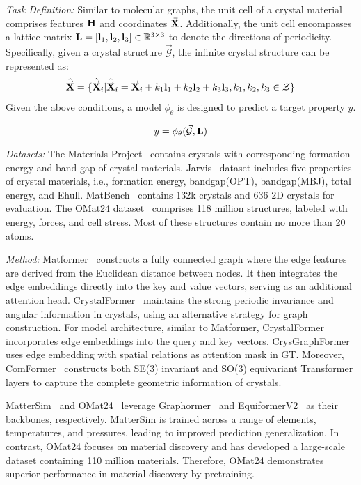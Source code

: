 \textit{Task Definition:}
Similar to molecular graphs, the unit cell of a crystal material comprises features $\mathbf{H}$ and  coordinates $\vec{\mathbf{X}}$. Additionally, the unit cell encompasses a lattice matrix $\mathbf{L} = [\mathbf{l}_1, \mathbf{l}_2, \mathbf{l}_3] \in \mathbb{R}^{3 \times 3}$ to denote the directions of periodicity. Specifically, given a crystal structure $\vec{\mathcal{G}}$, the infinite crystal structure can be represented as:
\begin{align}
    \hat{\vec{\mathbf{X}}} = \{ \hat{\vec{\mathbf{X}}}_i| \hat{\vec{\mathbf{X}}}_i = \vec{\mathbf{X}}_i + k_{1}\mathbf{l}_{1} + k_{2}\mathbf{l}_{2} + k_{3}\mathbf{l}_{3}, k_{1}, k_{2}, k_{3} \in \mathcal{Z} \}
\end{align}
Given the above conditions, a model $\phi_\theta$ is designed to predict a target property $y$.

\begin{equation}
    y = \phi_\theta(\vec{\mathcal{G}}, \mathbf{L})
\end{equation}

\textit{Datasets:}
The Materials Project~\cite{jain2013materials} contains crystals with corresponding formation energy and band gap of crystal materials. 
Jarvis~\cite{choudhary2020joint} dataset includes five properties of crystal materials, i.e., formation energy, bandgap(OPT), bandgap(MBJ), total energy, and Ehull.
MatBench~\cite{dunn2020benchmarking} contains 132k crystals and 636 2D crystals for evaluation.
The OMat24 dataset~\cite{barroso2024open} comprises 118 million structures, labeled with energy, forces, and cell stress. Most of these structures contain no more than 20 atoms.


\textit{Method:}
Matformer~\cite{yan2022periodic} constructs a fully connected graph where the edge features are derived from the Euclidean distance between nodes. It then integrates the edge embeddings directly into the key and value vectors, serving as an additional attention head.
CrystalFormer~\cite{wang2024conformal}  maintains the strong periodic invariance and angular information in crystals, 
using an alternative strategy for graph construction. 
For model architecture, similar to Matformer, CrystalFormer incorporates edge embeddings into the query and key vectors.
CrysGraphFormer~\cite{sun2024crysgraphformer} uses edge embedding with spatial relations as attention mask in GT. 
Moreover, ComFormer~\cite{yan2024complete} constructs both SE(3) invariant and SO(3) equivariant Transformer layers to capture the complete geometric information of crystals.

MatterSim~\cite{yang2024mattersim} and OMat24~\cite{barroso2024open} leverage  Graphormer~\cite{Graphormer} and EquiformerV2~\cite{equiformer_v2} as their backbones, respectively. MatterSim is trained across a range of elements, temperatures, and pressures, leading to improved prediction generalization. In contrast, OMat24 focuses on material discovery and has developed a large-scale dataset containing 110 million materials. Therefore, OMat24 demonstrates superior performance in material discovery by pretraining.

